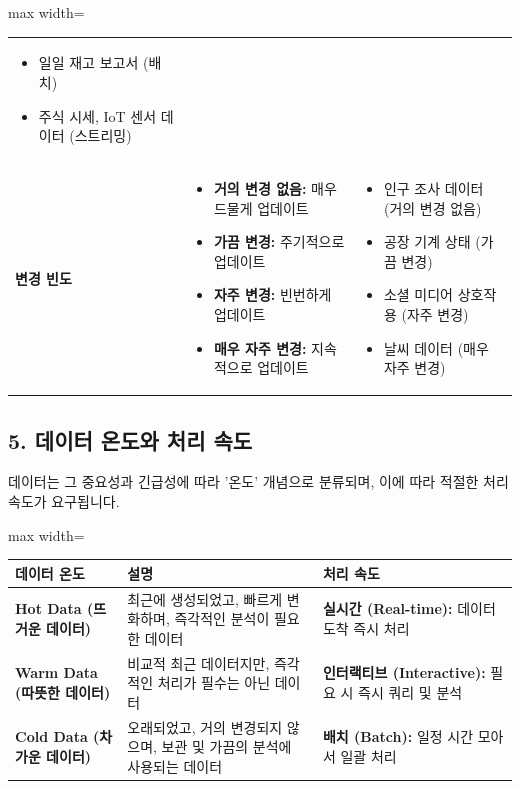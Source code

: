 \documentclass[11pt,a4paper]{article}
\begin{document}
\begin{adjustbox}{max width=\textwidth}
\begin{tabular}{lll}
\begin{itemize}
    \item 일일 재고 보고서 (배치)
    \item 주식 시세, IoT 센서 데이터 (스트리밍)
\end{itemize} \\
\textbf{변경 빈도} &
\begin{itemize}
    \item \textbf{거의 변경 없음:} 매우 드물게 업데이트
    \item \textbf{가끔 변경:} 주기적으로 업데이트
    \item \textbf{자주 변경:} 빈번하게 업데이트
    \item \textbf{매우 자주 변경:} 지속적으로 업데이트
\end{itemize} &
\begin{itemize}
    \item 인구 조사 데이터 (거의 변경 없음)
    \item 공장 기계 상태 (가끔 변경)
    \item 소셜 미디어 상호작용 (자주 변경)
    \item 날씨 데이터 (매우 자주 변경)
\end{itemize} \\
\bottomrule
\end{tabular}
\end{adjustbox}

\subsection*{5. 데이터 온도와 처리 속도}

데이터는 그 중요성과 긴급성에 따라 '온도' 개념으로 분류되며, 이에 따라 적절한 처리 속도가 요구됩니다.

\begin{adjustbox}{max width=\textwidth}
\begin{tabular}{lll}
\toprule
\textbf{데이터 온도} & \textbf{설명} & \textbf{처리 속도} \\
\midrule
\textbf{Hot Data (뜨거운 데이터)} & 최근에 생성되었고, 빠르게 변화하며, 즉각적인 분석이 필요한 데이터 & \textbf{실시간 (Real-time):} 데이터 도착 즉시 처리 \\
\textbf{Warm Data (따뜻한 데이터)} & 비교적 최근 데이터지만, 즉각적인 처리가 필수는 아닌 데이터 & \textbf{인터랙티브 (Interactive):} 필요 시 즉시 쿼리 및 분석 \\
\textbf{Cold Data (차가운 데이터)} & 오래되었고, 거의 변경되지 않으며, 보관 및 가끔의 분석에 사용되는 데이터 & \textbf{배치 (Batch):} 일정 시간 모아서 일괄 처리 \\
\bottomrule
\end{tabular}
\end{adjustbox}
\end{document}
